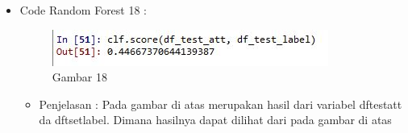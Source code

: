 \begin{enumerate}
\begin{itemize}
\begin{itemize}
\begin{itemize}
\begin{itemize}
\par
\end{itemize}
\item Code Random Forest 18 :
\par
\begin{figure}[ht]
\centering
\includegraphics[scale=0.7]{figures/cod18.jpg}
\caption{Gambar 18}
\label{contoh}
\end{figure}
\par
\begin{itemize}
\item Penjelasan : Pada gambar di atas merupakan hasil dari variabel dftestatt da dftsetlabel. Dimana hasilnya dapat dilihat dari pada gambar di atas
\par
\par
\end{itemize}

\end{itemize}



\end{itemize}
\end{itemize}
\end{enumerate}
